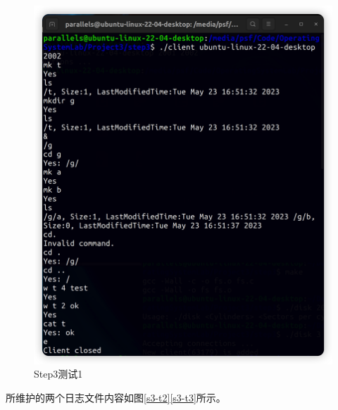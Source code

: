 \documentclass{article}
\begin{document}
\begin{figure}[H]
\center
\includegraphics[scale = 0.5]{s3-t1.png}
\caption{Step3测试1}
\label{s3-t1}
\end{figure}

所维护的两个日志文件内容如图\ref{s3-t2}\ref{s3-t3}所示。
\end{document}

